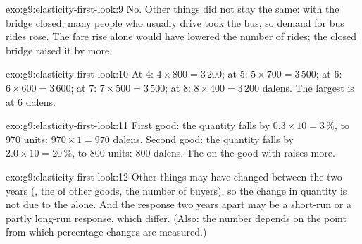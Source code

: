 \begin{solution}{exo:g9:elasticity-first-look:9}
No. Other things did not stay the same: with the bridge closed, many people who usually drive took the
bus, so demand for bus rides rose. The fare rise alone would have lowered the number of rides; the
closed bridge raised it by more.
\end{solution}

\begin{solution}{exo:g9:elasticity-first-look:10}
At 4: $4 \times 800 = 3\,200$; at 5: $5 \times 700 = 3\,500$; at 6: $6 \times 600 = 3\,600$; at 7: $7
\times 500 = 3\,500$; at 8: $8 \times 400 = 3\,200$ dalens. The largest  is at 6 dalens.
\end{solution}

\begin{solution}{exo:g9:elasticity-first-look:11}
First good: the quantity falls by $0.3 \times 10 = 3\,\%$, to 970 units:  $970 \times 1 = 970$
dalens. Second good: the quantity falls by $2.0 \times 10 = 20\,\%$, to 800 units:  800 dalens. The 
on the good with  raises more.
\end{solution}

\begin{solution}{exo:g9:elasticity-first-look:12}
Other things may have changed between the two years (, the  of other goods, the number of
buyers), so the change in quantity is not due to the  alone. And the response two years apart may
be a short-run or a partly long-run response, which differ. (Also: the number depends on the point from
which percentage changes are measured.)
\end{solution}

